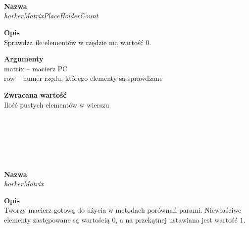 \begin{spacing}{1.1}
\begin{spacing}{1.1}
\begin{spacing}{1.1}
\begin{spacing}{1.2}
\begin{spacing}{1.1}
\begin{spacing}{1.2}
\begin{spacing}{1.2}
\begin{spacing}{1.2}
\begin{spacing}{1.2}
\begin{spacing}{1.2}
\begin{spacing}{1.2}
\begin{spacing}{1.2}
\begin{spacing}{1.2}
\\~\\ 
\begin{spacing}{1.3}
 \\ \begin{spacing}{0.5}  \end{spacing}

\textbf{Nazwa}\\  \emph{harkerMatrixPlaceHolderCount} \\ \begin{spacing}{0.3}  \end{spacing}
 
\textbf{Opis}\\ Sprawdza ile elementów w rzędzie ma wartość $0$. \\  \begin{spacing}{0.3}  \end{spacing}
 
\textbf{Argumenty} \\
matrix -- macierz PC \\ 
row -- numer rzędu, którego elementy są sprawdzane \\  \begin{spacing}{0.3}  \end{spacing}

\textbf{Zwracana wartość}\\ Ilość pustych elementów w wierszu \\ \begin{spacing}{0.3}  \end{spacing}\\


\\~\\ 
\begin{spacing}{1.3}
 \\ \begin{spacing}{0.5}  \end{spacing}

\textbf{Nazwa}\\  \emph{harkerMatrix} \\ \begin{spacing}{0.3}  \end{spacing}
 
\textbf{Opis}\\ Tworzy macierz gotową do użycia w metodach porównań parami. Niewłaściwe elementy zastępowane są wartością $0$, a na przekątnej ustawiana jest wartość $1$. \\  \begin{spacing}{0.3}  \end{spacing}
 

\end{spacing}
\end{spacing}
\end{spacing}
\end{spacing}
\end{spacing}
\end{spacing}
\end{spacing}
\end{spacing}
\end{spacing}
\end{spacing}
\end{spacing}
\end{spacing}
\end{spacing}
\end{spacing}
\end{spacing}
